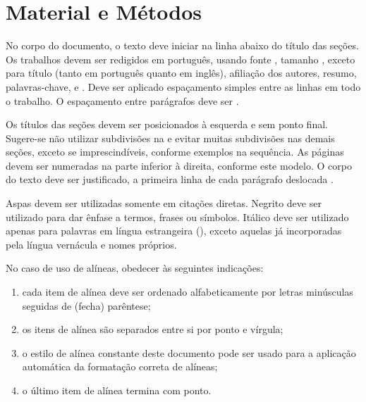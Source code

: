 \documentclass[%
  a4paper,%
  12pt,%
  fleqn,%
  english,%
  brazilian,%
]{article}
\begin{document}
\section{Material e Métodos}%
\label{sect:mat-meth}

No corpo do documento, o texto deve iniciar na linha abaixo do título das seções.
Os trabalhos devem ser redigidos em português, usando fonte , tamanho , exceto para título (tanto em português quanto em inglês), afiliação dos autores, resumo, palavras-chave,  e .
Deve ser aplicado espaçamento simples entre as linhas em todo o trabalho.
O espaçamento entre parágrafos deve ser .

Os títulos das seções devem ser posicionados à esquerda e sem ponto final.
Sugere-se não utilizar subdivisões na  e evitar muitas subdivisões nas demais seções, exceto se imprescindíveis, conforme exemplos na sequência.
As páginas devem ser numeradas na parte inferior à direita, conforme este modelo.
O corpo do texto deve ser justificado, a primeira linha de cada parágrafo deslocada .

Aspas devem ser utilizadas somente em citações diretas.
Negrito deve ser utilizado para dar ênfase a termos, frases ou símbolos.
Itálico deve ser utilizado apenas para palavras em língua estrangeira (), exceto aquelas já incorporadas pela língua vernácula e nomes próprios.

No caso de uso de alíneas, obedecer às seguintes indicações:

\begin{enumerate}[label = {\alphsect}]
\item cada item de alínea deve ser ordenado alfabeticamente por letras minúsculas seguidas de (fecha) parêntese;
\item os itens de alínea são separados entre si por ponto e vírgula;
\item o estilo de alínea constante deste documento pode ser usado para a aplicação automática da formatação correta de alíneas;
\item o último item de alínea termina com ponto.
\end{enumerate}
\end{document}
